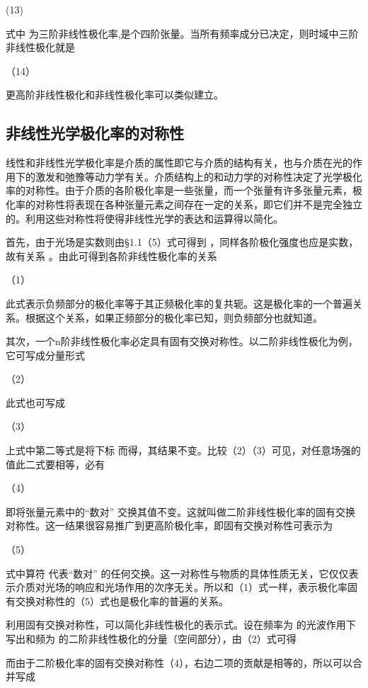       (13)

式中 为三阶非线性极化率,是个四阶张量。当所有频率成分已决定，则时域中三阶非线性极化就是

                                               （14）

更高阶非线性极化和非线性极化率可以类似建立。

\subsection{非线性光学极化率的对称性}
线性和非线性光学极化率是介质的属性即它与介质的结构有关，也与介质在光的作用下的激发和弛豫等动力学有关。介质结构上的和动力学的对称性决定了光学极化率的对称性。由于介质的各阶极化率是一些张量，而一个张量有许多张量元素，极化率的对称性将表现在各种张量元素之间存在一定的关系，即它们并不是完全独立的。利用这些对称性将使得非线性光学的表达和运算得以简化。

首先，由于光场是实数则由§1.1（5）式可得到 ，同样各阶极化强度也应是实数，故有关系 。由此可得到各阶非线性极化率的关系

                           （1）
                           
此式表示负频部分的极化率等于其正频极化率的复共轭。这是极化率的一个普遍关系。根据这个关系，如果正频部分的极化率已知，则负频部分也就知道。

其次，一个n阶非线性极化率必定具有固有交换对称性。以二阶非线性极化为例，它可写成分量形式  

                        （2）

此式也可写成

                             （3）

上式中第二等式是将下标 而得，其结果不变。比较（2）（3）可见，对任意场强的值此二式要相等，必有

                            （4）

即将张量元素中的“数对” 交换其值不变。这就叫做二阶非线性极化率的固有交换对称性。这一结果很容易推广到更高阶极化率，即固有交换对称性可表示为

                             （5）

式中算符 代表“数对” 的任何交换。这一对称性与物质的具体性质无关，它仅仅表示介质对光场的响应和光场作用的次序无关。所以和（1）式一样，表示极化率固有交换对称性的（5）式也是极化率的普遍的关系。

利用固有交换对称性，可以简化非线性极化的表示式。设在频率为 的光波作用下写出和频为 的二阶非线性极化的分量（空间部分），由（2）式可得

       
而由于二阶极化率的固有交换对称性（4），右边二项的贡献是相等的，所以可以合并写成

